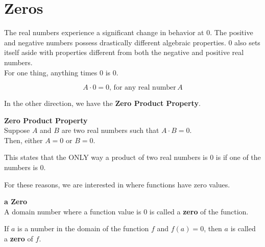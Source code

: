 \documentclass{ximera}
\begin{document}
\section{Zeros}

The real numbers experience a significant change in behavior at $0$.  The positive and negative numbers possess drastically different algebraic properties.  $0$ also sets itself aside with properties different from both the negative and positive real numbers. \\


For one thing, anything times $0$ is $0$.


\[
A \cdot 0 = 0, \, \text{for any real number} \, A
\]

In the other direction, we have the \textbf{\textcolor{purple!85!blue}{Zero Product Property}}.  








\begin{definition}  \textbf{\textcolor{green!50!black}{Zero Product Property}} \\


Suppose $A$ and $B$ are two real numbers such that $A \cdot B = 0$. \\


Then, either $A = 0$ or $B = 0$.




\end{definition}









This states that the ONLY way a product of two real numbers is $0$ is if one of the numbers is $0$.

For these reasons, we are interested in where functions have zero values.






\begin{definition}  \textbf{\textcolor{green!50!black}{a Zero}} \\


A domain number where a function value is $0$ is called a \textbf{zero} of the function.


\begin{center}
If $a$ is a number in the domain of the function $f$ and $f(a) = 0$, then $a$ is called a \textbf{zero} of $f$.
\end{center}




\end{definition}
\end{document}
